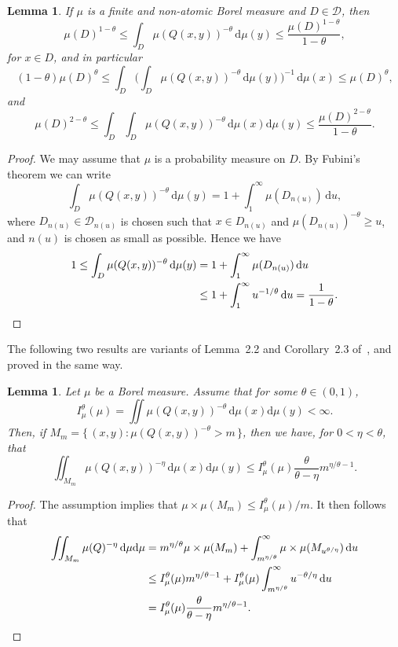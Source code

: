 \documentclass[10pt]{amsart}
\newtheorem{lemm}[theo]{Lemma}\newtheorem{prop}[theo]{Proposition}\newtheorem{coro}[theo]{Corollary}\newtheorem{conj}[theo]{Conjecture}
\theoremstyle{definition}\newtheorem{defi}[theo]{Definition}\newtheorem{rema}[theo]{Remark}\newtheorem{exam}[theo]{Example}\newtheorem{exem}[theo]{Example}\newtheorem{nota}[theo]{Notation}
\newcommand*{\dd}{\mathrm{d}}
\begin{document}
\begin{lemm}\label{lem:energyestimate}
If $\mu$ is a finite and non-atomic Borel measure and $D\in
\mathscr{D}$, then
\[
\mu(D)^{1-\theta} \leq \int_D \mu (Q(x,y))^{-\theta} \, \dd
\mu (y) \leq \frac{\mu(D)^{1 - \theta}}{1 - \theta},
\]
for $x \in D$, and in particular
\[
(1 - \theta) \mu (D)^\theta \leq \int_D \biggl(\int_D \mu (Q(x,y))^{-\theta} \, \dd \mu (y) \biggr)^{-1} \, \dd
\mu (x) \leq \mu (D)^\theta,
\]
and
\[
\mu(D)^{2-\theta} \leq \int_D \int_D \mu(Q(x,y))^{-\theta} \,
\dd \mu(x) \dd \mu (y) \leq \frac{\mu(D)^{2-\theta}}{1 - \theta}.
\]
\end{lemm}

\begin{proof}
We may assume that $\mu$ is a probability measure on $D$. By Fubini's theorem we can write
\[
\int_D \mu (Q(x,y))^{-\theta} \, \dd \mu (y) = 1 +
\int_1^\infty \mu (D_{n(u)}) \, \dd u,
\]
where $D_{n(u)} \in \mathscr{D}_{n(u)}$ is chosen such that $x \in D_{n(u)}$ and $\mu (D_{n(u)})^{-\theta} \geq u$, and $n (u)$ is chosen as small as possible. Hence we have
\begin{align*}
1 \leq \int_D \mu (Q(x,y))^{-\theta} \, \dd \mu (y) &= 1 +
\int_1^\infty \mu (D_{n(u)}) \, \dd u \\ &\leq 1 +
\int_1^\infty u^{-1/\theta} \, \dd u = \frac{1}{1 -
\theta}. \qedhere
\end{align*}
\end{proof}

The following two results are variants of Lemma~2.2 and Corollary~2.3 of~\cite{perssonreeve}, and proved in the same way.

\begin{lemm}\label{lem:Mm}
Let $\mu$ be a Borel measure. Assume that for some $\theta \in (0,1)$,
\[
I_\mu^\theta (\mu) = \iint \mu (Q(x,y))^{-\theta} \,
\dd\mu (x) \dd \mu (y) < \infty.
\]
Then, if $M_m = \{\, (x,y) : \mu (Q(x,y))^{-\theta} > m \,\}$, then we have, for $0 < \eta < \theta$, that
\[
\iint_{M_m} \mu (Q(x,y))^{-\eta} \, \dd \mu (x) \dd
\mu (y) \leq I_\mu^\theta (\mu) \frac{\theta}{\theta - \eta} m^{\eta/\theta - 1}.
\]
\end{lemm}

\begin{proof}
The assumption implies that $\mu \times \mu (M_m) \leq I_\mu^\theta (\mu) /m$. It then follows that
\begin{align*}
\iint_{M_m} \mu (Q)^{-\eta} \, \dd\mu \dd \mu & = m^{\eta/\theta} \mu \times \mu (M_m) +
\int_{m^{\eta/\theta}}^\infty \mu \times \mu (M_{u^{\theta/\eta}})
\, \dd u \\ &\leq I_\mu^\theta (\mu) m^{\eta/\theta - 1} + I_\mu^\theta (\mu) \int_{m^{\eta/\theta}}^\infty u^{-\theta/\eta}
\, \dd u \\ &= I_\mu^\theta (\mu) \frac{\theta}{\theta -
\eta} m^{\eta/\theta - 1}. \qedhere
\end{align*}
\end{proof}
\end{document}
